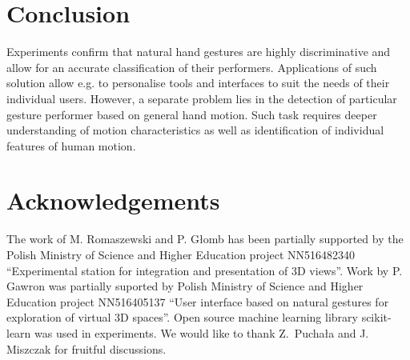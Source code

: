 \documentclass[]{article}
\begin{document}
\section{Conclusion}
Experiments confirm that natural hand gestures are highly discriminative and
allow for an accurate classification of their performers. Applications of such
solution allow e.g. to personalise tools and interfaces to suit the needs of
their individual users.  However, a separate problem lies in the detection of
particular gesture performer based on general hand motion. Such task requires
deeper understanding of motion characteristics as well as identification of
individual features of human motion.

\section*{Acknowledgements}
The work of M. Romaszewski and P. G{\l}omb has been partially supported  by the
Polish Ministry of Science and Higher Education project NN516482340
``Experimental station for integration and presentation of 3D views''. Work by
P. Gawron was partially suported by  Polish Ministry of Science and Higher
Education project NN516405137 ``User interface based on natural gestures  for
exploration of virtual 3D spaces''. Open source machine learning library
scikit-learn \cite{scikit-learn} was used in experiments. We would like to
thank Z.~Pucha{\l}a and J. Miszczak for fruitful discussions.
\end{document}
